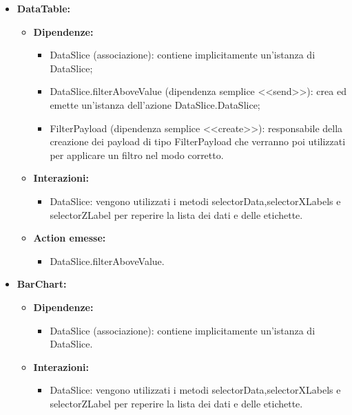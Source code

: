 \begin{itemize}
    \item \textbf{DataTable:}
          \begin{itemize}
              \item \textbf{Dipendenze:}
                    \begin{itemize}
                        \item DataSlice (associazione): contiene implicitamente un'istanza di DataSlice;
                        \item DataSlice.filterAboveValue (dipendenza semplice <<send>>): crea ed emette
                              un'istanza dell'azione DataSlice.DataSlice;
                        \item FilterPayload (dipendenza semplice <<create>>): responsabile della creazione
                              dei payload di tipo FilterPayload che verranno poi utilizzati per applicare un
                              filtro nel modo corretto.
                    \end{itemize}
              \item \textbf{Interazioni:}
                    \begin{itemize}
                        \item DataSlice: vengono utilizzati i metodi selectorData,selectorXLabels e
                              selectorZLabel per reperire la lista dei dati e delle etichette.
                    \end{itemize}
              \item \textbf{Action emesse:}
                    \begin{itemize}
                        \item DataSlice.filterAboveValue.
                    \end{itemize}
          \end{itemize}

    \item \textbf{BarChart:}
          \begin{itemize}
              \item \textbf{Dipendenze:}
                    \begin{itemize}
                        \item DataSlice (associazione): contiene implicitamente un'istanza di DataSlice.
                    \end{itemize}
              \item \textbf{Interazioni:}
                    \begin{itemize}
                        \item DataSlice: vengono utilizzati i metodi selectorData,selectorXLabels e
                              selectorZLabel per reperire la lista dei dati e delle etichette.
                    \end{itemize}
          \end{itemize}


\end{itemize}
